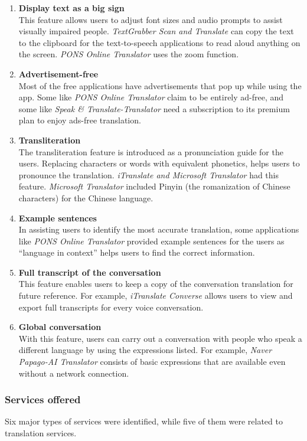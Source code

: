 \documentclass[english]{textolivre}
\begin{document}
\begin{enumerate}
    \item \textbf{Display text as a big sign} \\
    This feature allows users to adjust font sizes and audio prompts to assist visually impaired people. \textit{TextGrabber Scan and Translate} can copy the text to the clipboard for the text-to-speech applications to read aloud anything on the screen. \textit{PONS Online Translator} uses the zoom function.
    \item \textbf{Advertisement-free} \\
    Most of the free applications have advertisements that pop up while using the app. Some like \textit{PONS Online Translator} claim to be entirely ad-free, and some like \textit{Speak \& Translate-Translator} need a subscription to its premium plan to enjoy ads-free translation.
    \item \textbf{Transliteration} \\
    The transliteration feature is introduced as a pronunciation guide for the users. Replacing characters or words with equivalent phonetics, helps users to pronounce the translation. \textit{iTranslate and Microsoft Translator} had this feature. \textit{Microsoft Translator} included Pinyin (the romanization of Chinese characters) for the Chinese language.
    \item \textbf{Example sentences} \\
    In assisting users to identify the most accurate translation, some applications like \textit{PONS Online Translator} provided example sentences for the users as “language in context” helps users to find the correct information.
    \item \textbf{Full transcript of the conversation} \\
    This feature enables users to keep a copy of the conversation translation for future reference. For example, \textit{iTranslate Converse} allows users to view and export full transcripts for every voice conversation.
    \item \textbf{Global conversation} \\
    With this feature, users can carry out a conversation with people who speak a different language by using the expressions listed. For example, \textit{Naver Papago-AI Translator} consists of basic expressions that are available even without a network connection.
\end{enumerate}

\subsubsection{Services offered}\label{sec-quotesandfootnotes}
Six major types of services were identified, while five of them were related to translation services.
\end{document}
